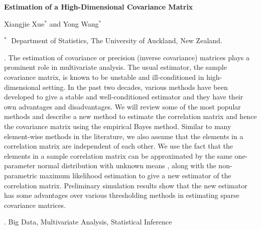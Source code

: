 \documentclass[12pt]{article}
\begin{document}
\begin{flushleft}


{\LARGE\bf Estimation of a High-Dimensional Covariance Matrix}


\vspace{1.0cm}

Xiangjie Xue$^*$ and Yong Wang$^*$

\begin{description}

\item $^* \;$ Department of Statistics, The University of Auckland,
New Zealand.

\end{description}

\end{flushleft}


\vspace{0.75cm}

. The estimation of covariance or precision (inverse covariance) matrices plays a prominent role in multivariate analysis. The usual estimator, the sample covariance matrix, is known to be unstable and ill-conditioned in high-dimensional setting. In the past two decades, various methods have been developed to give a stable and well-conditioned estimator and they have their own advantages and disadvantages. We will review some of the most popular methods \nocite{RN36} and describe a new method to estimate the correlation matrix and hence the covariance matrix using the empirical Bayes method. Similar to many element-wise methods in the literature, we also assume that the elements in a correlation matrix are independent of each other. We use the fact that the elements in a sample correlation matrix can be approximated by the same one-parameter normal distribution with unknown means \nocite{RN31}, along with the non-parametric maximum likelihood estimation \nocite{RN87} to give a new estimator of the correlation matrix. Preliminary simulation results show that the new estimator has some advantages over various thresholding methods in estimating sparse covariance matrices.



\vskip 2mm

.
Big Data, Multivariate Analysis, Statistical Inference
\end{document}
